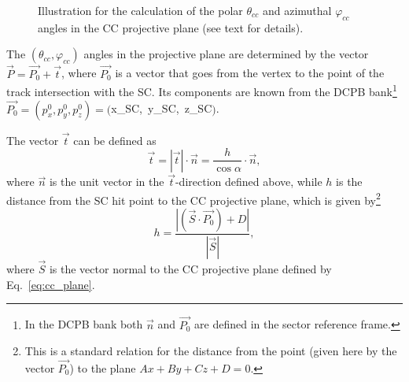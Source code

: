 \begin{figure}[htp]
\begin{center}
\caption{\small  Illustration for the calculation of the polar $\theta_{cc}$ and azimuthal $\varphi_{cc}$ angles in the CC projective plane (see text for details).} \label{fig:cc_plane_def}
\end{center}
\end{figure}


The $(\theta_{cc},\varphi_{cc})$ angles in the projective plane are determined by the vector $\overrightarrow{P}=\overrightarrow{P_{0}}+\overrightarrow{t}$, where $\overrightarrow{P_{0}}$ is a vector that goes from the vertex to the point of the track intersection with the SC. Its components are known from the DCPB bank\footnote[2]{In the DCPB bank both $\overrightarrow{n}$ and $\overrightarrow{P_{0}}$ are defined in the sector reference frame.} $\overrightarrow{P_{0}} = (p_{x}^{0},p_{y}^{0},p_{z}^{0}) = ($x\_SC,~y\_SC,~z\_SC$)$.

The vector $\overrightarrow{t}$ can be defined as
\begin{equation}
 \overrightarrow{t} =  | \overrightarrow{t}  |\cdot \overrightarrow{n}  =  \frac{h}{\cos \alpha}\cdot \overrightarrow{n},
\label{eq:cc_t_vec} 
\end{equation}
where $\overrightarrow{n}$ is the unit vector in the $\overrightarrow{t}$-direction defined above, while $h$ is the distance from the SC hit point to the CC projective plane, which is given by\footnote[3]{This is a standard relation for the distance from the point (given here by the vector $\overrightarrow{P_{0}}$) to the plane $Ax+By+Cz+D = 0$. }
\begin{equation}
h=\frac{|(\overrightarrow{S} \cdot \overrightarrow{P_{0}})+D|}{ |\overrightarrow{S}  |},
\label{eq:cc_h_distance}
\end{equation}
where $\overrightarrow{S}$ is the vector normal to the CC projective plane defined by Eq.~\eqref{eq:cc_plane}.

